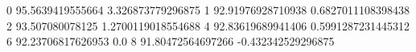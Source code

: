 0 95.5639419555664 3.326873779296875
1 92.91976928710938 0.6827011108398438
2 93.507080078125 1.2700119018554688
4 92.83619689941406 0.5991287231445312
6 92.23706817626953 0.0
8 91.80472564697266 -0.432342529296875

